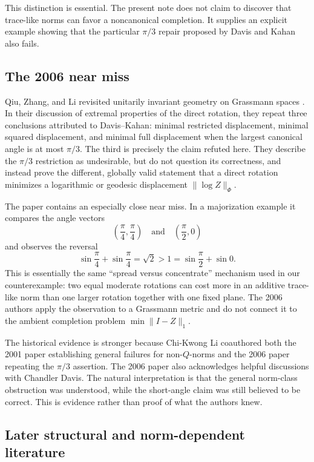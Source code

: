 \documentclass[11pt]{article}
\begin{document}
This distinction is essential.  The present note does not claim to discover
that trace-like norms can favor a noncanonical completion.  It supplies an
explicit example showing that the particular $\pi/3$ repair proposed by Davis
and Kahan also fails.

\subsection{The 2006 near miss}

Qiu, Zhang, and Li revisited unitarily invariant geometry on Grassmann spaces
\cite{QiuZhangLi2006}.  In their discussion of extremal properties of the
direct rotation, they repeat three conclusions attributed to Davis--Kahan:
minimal restricted displacement, minimal squared displacement, and minimal
full displacement when the largest canonical angle is at most $\pi/3$.  The
third is precisely the claim refuted here.  They describe the $\pi/3$
restriction as undesirable, but do not question its correctness, and instead
prove the different, globally valid statement that a direct rotation minimizes
a logarithmic or geodesic displacement $\lVert\log Z\rVert_\Phi$.

The paper contains an especially close near miss.  In a majorization example it
compares the angle vectors
\[
 \left(\frac\pi4,\frac\pi4\right)
 \quad\text{and}\quad
 \left(\frac\pi2,0\right)
\]
and observes the reversal
\[
 \sin\frac\pi4+\sin\frac\pi4
   =\sqrt2
   >1
   =\sin\frac\pi2+\sin0.
\]
This is essentially the same ``spread versus concentrate'' mechanism used in
our counterexample: two equal moderate rotations can cost more in an additive
trace-like norm than one larger rotation together with one fixed plane.  The
2006 authors apply the observation to a Grassmann metric and do not connect it
to the ambient completion problem $\min\lVert I-Z\rVert_1$.

The historical evidence is stronger because Chi-Kwong Li coauthored both the
2001 paper establishing general failures for non-$Q$-norms and the 2006 paper
repeating the $\pi/3$ assertion.  The 2006 paper also acknowledges helpful
discussions with Chandler Davis.  The natural interpretation is that the
general norm-class obstruction was understood, while the short-angle claim was
still believed to be correct.  This is evidence rather than proof of what the
authors knew.

\subsection{Later structural and norm-dependent literature}
\end{document}
